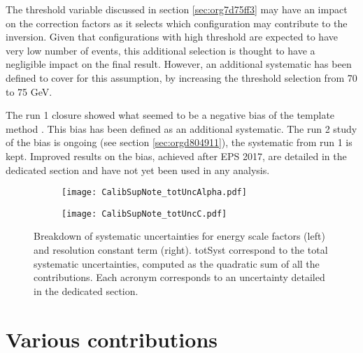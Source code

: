 The threshold variable discussed in section \ref{sec:org7d75ff3} may have an impact on the correction factors as it selects which configuration may contribute to the inversion.
Given that configurations with high threshold are expected to have very low number of events, this additional selection is thought to have a negligible impact on the final result.
However, an additional systematic has been defined to cover for this assumption, by increasing the threshold selection from 70 to 75 GeV.

The run 1 closure showed what seemed to be a negative bias of the template method \cite{ATL-COM-PHYS-2013-1653}.
This bias has been defined as an additional systematic.
The run 2 study of the bias is ongoing (see section \ref{sec:orgd804911}), the systematic from run 1 is kept.
Improved results on the bias, achieved after EPS 2017, are detailed in the dedicated section and have not yet been used in any analysis.

\begin{figure}
\begin{subfigure}[t]{0.49\linewidth}
\begin{center}
\texttt{[image: CalibSupNote\_totUncAlpha.pdf]}
\end{center}
\end{subfigure}
\begin{subfigure}[t]{0.49\linewidth}
\begin{center}
\texttt{[image: CalibSupNote\_totUncC.pdf]}
\end{center}
\end{subfigure}
\caption{\label{org5c57d23}
  Breakdown of systematic uncertainties for energy scale factors (left) and resolution constant term (right).
  totSyst correspond to the total systematic uncertainties, computed as the quadratic sum of all the contributions.
  Each acronym corresponds to an uncertainty detailed in the dedicated section.
}
\end{figure}



\section{Various contributions}
\label{sec:orgcefe868}

